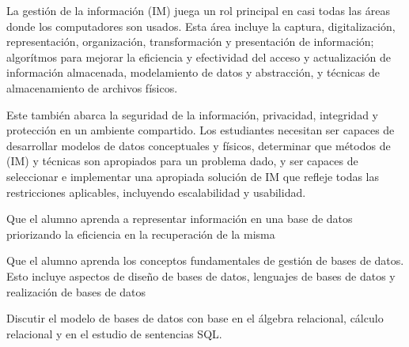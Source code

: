\begin{syllabus}


\begin{justification}
La gestión de la información (IM) juega un rol principal en casi todas las áreas donde los computadores son usados. 
Esta área incluye la captura, digitalización, representación, organización, transformación y presentación de información; 
algorítmos para mejorar la eficiencia y efectividad del acceso y actualización de información almacenada, 
modelamiento de datos y abstracción, y técnicas de almacenamiento de archivos físicos.

Este también abarca la seguridad de la información, privacidad, integridad y protección en un ambiente compartido. 
Los estudiantes necesitan ser capaces de desarrollar modelos de datos conceptuales y físicos, determinar que métodos de (IM) y 
técnicas son apropiados para un problema dado, y ser capaces de seleccionar e implementar una apropiada solución de IM 
que refleje todas las restricciones aplicables, incluyendo escalabilidad y usabilidad.
\end{justification}

\begin{goals}
\item Que el alumno aprenda a representar información en una base de datos priorizando la eficiencia en la recuperación de la misma
\item Que el alumno aprenda los conceptos fundamentales de gestión de bases de datos. Esto incluye aspectos de diseño de bases de datos, lenguajes de bases de datos y realización de bases de datos
\item Discutir el modelo de bases de datos con base en el álgebra relacional, cálculo relacional y en el estudio de sentencias SQL.
\end{goals}

\begin{outcomes}
    \item {}
    \item {}
    \item {}
    \item {}
\end{outcomes}

\begin{competences}
    \item {} 
    \item {}
    \item {}
    \item {}
    \item {}
\end{competences}


\end{syllabus}
